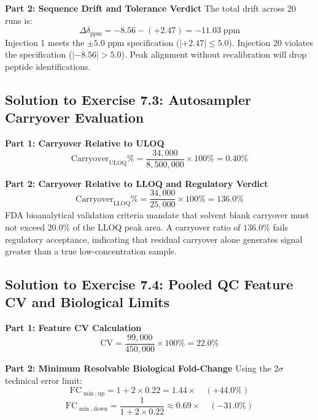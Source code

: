 \documentclass[11pt,twoside,openright]{book}
\begin{document}
\noindent\textbf{Part 2: Sequence Drift and Tolerance Verdict}\enspace
The total drift across 20 runs is:
\begin{equation}
\Delta \delta_{\text{ppm}} = -8.56 - (+2.47) = -11.03\;\text{ppm}
\end{equation}
Injection 1 meets the $\pm 5.0$ ppm specification ($|+2.47| \le 5.0$). Injection 20 violates the specification ($|-8.56| > 5.0$). Peak alignment without recalibration will drop peptide identifications.

\subsection{Solution to Exercise 7.3: Autosampler Carryover Evaluation}
\noindent\textbf{Part 1: Carryover Relative to ULOQ}\enspace
\begin{equation}
\text{Carryover}_{\text{ULOQ}}\% = \frac{34,000}{8,500,000} \times 100\% = 0.40\%
\end{equation}

\noindent\textbf{Part 2: Carryover Relative to LLOQ and Regulatory Verdict}\enspace
\begin{equation}
\text{Carryover}_{\text{LLOQ}}\% = \frac{34,000}{25,000} \times 100\% = 136.0\%
\end{equation}
FDA bioanalytical validation criteria mandate that solvent blank carryover must not exceed $20.0\%$ of the LLOQ peak area. A carryover ratio of $136.0\%$ fails regulatory acceptance, indicating that residual carryover alone generates signal greater than a true low-concentration sample.

\subsection{Solution to Exercise 7.4: Pooled QC Feature CV and Biological Limits}
\noindent\textbf{Part 1: Feature CV Calculation}\enspace
\begin{equation}
\text{CV} = \frac{99,000}{450,000} \times 100\% = 22.0\%
\end{equation}

\noindent\textbf{Part 2: Minimum Resolvable Biological Fold-Change}\enspace
Using the $2\sigma$ technical error limit:
\begin{equation}
\text{FC}_{\min, \text{up}} = 1 + 2 \times 0.22 = 1.44\times \quad (+44.0\%)
\end{equation}
\begin{equation}
\text{FC}_{\min, \text{down}} = \frac{1}{1 + 2 \times 0.22} \approx 0.69\times \quad (-31.0\%)
\end{equation}
\end{document}
